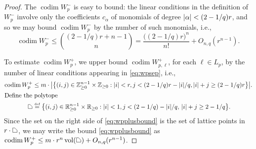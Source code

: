 \documentclass{daj}
\theoremstyle{definition}
\newcommand*{\eqdef}{\stackrel{\mbox{\normalfont\tiny def}}{=}}   %
\newcommand*{\Znneg}{\mathbb{Z}_{\geq 0}}                          %
\newcommand*{\Rnneg}{\mathbb{R}_{\geq 0}}                          %
\DeclarePairedDelimiter\abs{\lvert}{\rvert}                     %
\newcommand*{\polytope}{\mskip1mu\tikz{\draw (0,0)--(0,1.5ex)-- (0.7ex,1.5ex) -- (1.5ex,0.7ex)--(1.5ex,0)--cycle;}\mskip1mu}
\DeclareMathOperator{\vol}{vol}                                %
\DeclareMathOperator{\codim}{codim}                            %
\begin{document}
\begin{proof}
  The $\codim W_p^{-}$ is easy to bound: the linear conditions in the definition of $W_p^{-}$ involve only
  the coefficients $c_{\alpha}$ of monomials of degree $\abs{\alpha}<(2-1/q)r$, and so we may bound $\codim W_p^{-}$
  by the number of such monomials, i.e.,
  \begin{equation}\label{eq:wpminus}
    \codim W_p^{-}\leq \binom{(2-1/q)r+n-1}{n}=\frac{\bigl((2-1/q)r\bigr)^n}{n!}+O_{n,q}(r^{n-1}).
  \end{equation}

  To estimate $\codim W_p^+$, we upper bound $\codim W_{p,\ell}^{+}$, for each $\ell\in L_p$, by the number of linear conditions appearing in \eqref{eq:wpsep}, i.e., 
  \begin{align}\label{eq:wpplusbound}
    \codim W_p^{+}&\leq m\cdot \abs[\big]{\bigl\{(i,j)\in \Znneg^{n-1}\times \Znneg :\abs{i}<r, j<(2-1/q)r-\abs{i}/q, \abs{i}+j\geq (2-1/q)r\bigr\}}.\\
  \intertext{Define the polytope}
    \polytope &\eqdef \bigl\{(i,j)\in \Rnneg^{n-1}\times \Rnneg :\abs{i}<1, j<(2-1/q)-\abs{i}/q,\, \abs{i}+j\geq 2-1/q\bigr\}.
  \end{align}
  Since the set on the right side of \eqref{eq:wpplusbound} is the set of lattice points in $r\cdot \polytope$, we may
  write the bound \eqref{eq:wpplusbound} as $\codim W_p^+\leq m\cdot r^n\vol (\polytope) + O_{n,q}(r^{n-1})$.


\end{proof}
\end{document}
